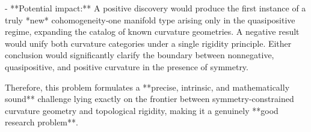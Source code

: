 - **Potential impact:**  
  A positive discovery would produce the first instance of a truly *new* cohomogeneity‑one manifold type arising only in the quasipositive regime, expanding the catalog of known curvature geometries.  A negative result would unify both curvature categories under a single rigidity principle.  Either conclusion would significantly clarify the boundary between nonnegative, quasipositive, and positive curvature in the presence of symmetry.  

Therefore, this problem formulates a **precise, intrinsic, and mathematically sound** challenge lying exactly on the frontier between symmetry‑constrained curvature geometry and topological rigidity, making it a genuinely **good research problem**.